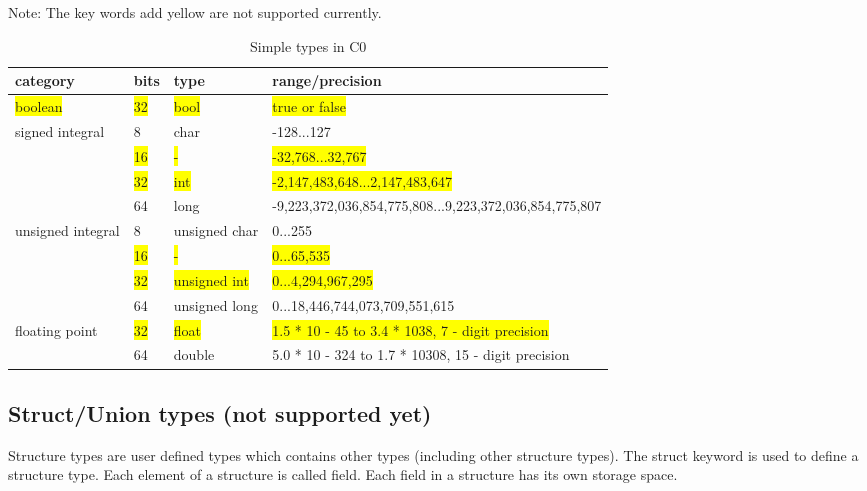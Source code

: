 \documentclass[a4paper]{article}
\begin{document}
\begin{table}[htbp]
\centering
\caption{Simple types in C0}
\begin{tablenotes}
\small
\centering
\item Note: The key words add yellow are not supported currently.
\end{tablenotes}
\begin{tabular}{|l|l|l|l|}
\hline
category & bits & type & range/precision\\
\hline
\colorbox{yellow}{boolean} & \colorbox{yellow}{32} & \colorbox{yellow}{bool} & \colorbox{yellow}{true or false}\\
\hline
\multirow{4}{*}{signed integral} & 8 & char & -128...127\\\cline{2-4}
 & \colorbox{yellow}{16} & \colorbox{yellow}{-} & \colorbox{yellow}{-32,768...32,767}\\\cline{2-4}
 & \colorbox{yellow}{32} & \colorbox{yellow}{int} & \colorbox{yellow}{-2,147,483,648...2,147,483,647}\\\cline{2-4}
 & 64 & long & -9,223,372,036,854,775,808...9,223,372,036,854,775,807\\\cline{2-4} \hline
\multirow{4}{*}{unsigned integral} & 8 & unsigned char & 0...255\\\cline{2-4}
 & \colorbox{yellow}{16} & \colorbox{yellow}{-} & \colorbox{yellow}{0...65,535}\\\cline{2-4}
 & \colorbox{yellow}{32} & \colorbox{yellow}{unsigned int} & \colorbox{yellow}{0...4,294,967,295}\\\cline{2-4}
 & 64 & unsigned long & 0...18,446,744,073,709,551,615\\\cline{2-4} \hline
\multirow{2}{*}{floating point} & \colorbox{yellow}{32} & \colorbox{yellow}{float} & \colorbox{yellow}{1.5 * 10 - 45 to 3.4 * 1038, 7 - digit precision}\\\cline{2-4}
 & 64 & double & 5.0 * 10 - 324 to 1.7 * 10308, 15 - digit precision\\\cline{2-4} \hline
\end{tabular}
\label{table:c0-types}
\end{table}

{\color{lightblue}\subsection{Struct/Union types (not supported yet)}}

Structure types are user defined types which contains other types (including other structure types).  The struct keyword is used to define a structure type. Each element of a structure is called field. Each field in a structure has its own storage space.
\end{document}
